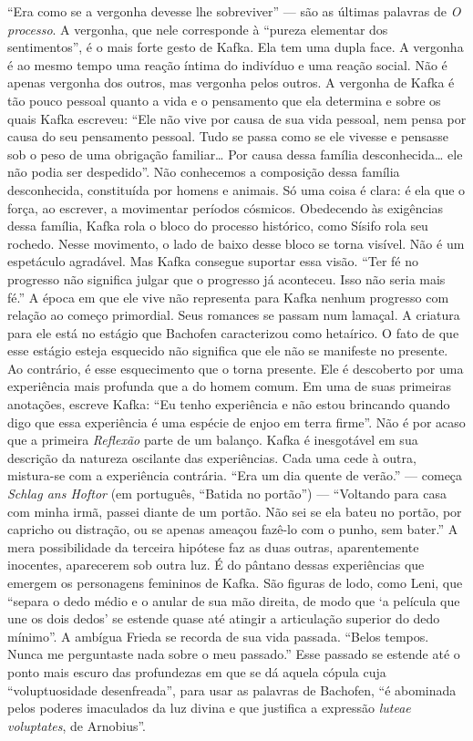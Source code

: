 ``Era como se a vergonha devesse lhe sobreviver'' --- são as últimas
palavras de \textit{O processo}. A vergonha, que nele corresponde à ``pureza
elementar dos sentimentos'', é o mais forte gesto de Kafka. Ela tem uma
dupla face. A vergonha é ao mesmo tempo uma reação íntima do indivíduo e
uma reação social. Não é apenas vergonha dos outros, mas vergonha pelos
outros. A vergonha de Kafka é tão pouco pessoal quanto a vida e o
pensamento que ela determina e sobre os quais Kafka escreveu: ``Ele não
vive por causa de sua vida pessoal, nem pensa por causa do seu
pensamento pessoal. Tudo se passa como se ele vivesse e pensasse sob o
peso de uma obrigação familiar\ldots{} Por causa dessa família
desconhecida\ldots{} ele não podia ser despedido''. Não conhecemos a
composição dessa família desconhecida, constituída por homens e animais.
Só uma coisa é clara: é ela que o força, ao escrever, a movimentar
períodos cósmicos. Obedecendo às exigências dessa família, Kafka rola o
bloco do processo histórico, como Sísifo rola seu rochedo. Nesse
movimento, o lado de baixo desse bloco se torna visível. Não é um
espetáculo agradável. Mas Kafka consegue suportar essa visão. ``Ter fé
no progresso não significa julgar que o progresso já aconteceu. Isso não
seria mais fé.'' A época em que ele vive não representa para Kafka
nenhum progresso com relação ao começo primordial. Seus romances se
passam num lamaçal. A criatura para ele está no estágio que Bachofen
caracterizou como hetaírico. O fato de que esse estágio esteja esquecido
não significa que ele não se manifeste no presente. Ao contrário, é esse
esquecimento que o torna presente. Ele é descoberto por uma experiência
mais profunda que a do homem comum. Em uma de suas primeiras anotações,
escreve Kafka: ``Eu tenho experiência e não estou brincando quando digo
que essa experiência é uma espécie de enjoo em terra firme''. Não é por
acaso que a primeira \textit{Reflexão} parte de um balanço. Kafka é inesgotável
em sua descrição da natureza oscilante das experiências. Cada uma cede à
outra, mistura-se com a experiência contrária. ``Era um dia quente de
verão.'' --- começa \textit{Schlag ans Hoftor} (em português, ``Batida no portão'') ---
``Voltando para casa com minha irmã, passei diante de um portão. Não sei
se ela bateu no portão, por capricho ou distração, ou se apenas ameaçou
fazê-lo com o punho, sem bater.'' A mera possibilidade da terceira
hipótese faz as duas outras, aparentemente inocentes, aparecerem sob
outra luz. É do pântano dessas experiências que emergem os personagens
femininos de Kafka. São figuras de lodo, como Leni, que ``separa o dedo
médio e o anular de sua mão direita, de modo que `a película que une os
dois dedos' se estende quase até atingir a articulação superior do dedo
mínimo''. A ambígua Frieda se recorda de sua vida passada. ``Belos
tempos. Nunca me perguntaste nada sobre o meu passado.'' Esse passado se
estende até o ponto mais escuro das profundezas em que se dá aquela
cópula cuja ``voluptuosidade desenfreada'', para usar as palavras de
Bachofen, ``é abominada pelos poderes imaculados da luz divina e que
justifica a expressão \textit{luteae voluptates}, de Arnobius''.

